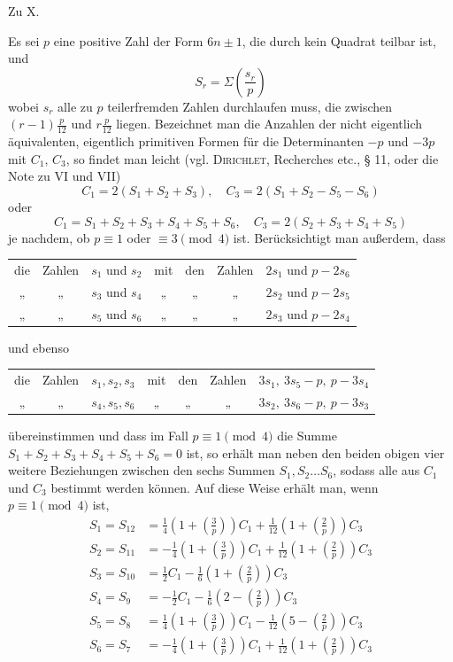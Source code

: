 \begin{center}\large Zu X.\end{center}

Es sei $p$ eine positive Zahl der Form $6n\pm1$, die durch kein Quadrat teilbar ist, und
\[
S_r=\Sigma\left(\frac{s_r}p\right)
\]
wobei $s_r$ alle zu $p$ teilerfremden Zahlen durchlaufen muss, die zwischen $(r-1)\frac p{12}$ und $r\frac p{12}$ liegen. Bezeichnet man die Anzahlen der nicht eigentlich äquivalenten, eigentlich primitiven Formen für die Determinanten $-p$ und $-3p$ mit $C_1$, $C_3$, so findet man leicht (vgl. \textsc{Dirichlet}, Recherches etc., § 11, oder die Note zu VI und VII)
\[
C_1=2(S_1+S_2+S_3),\quad C_3=2(S_1+S_2-S_5-S_6)
\]
oder
\[
C_1=S_1+S_2+S_3+S_4+S_5+S_6,\quad C_3=2(S_2+S_3+S_4+S_5)
\]
je nachdem, ob $p\equiv1$ oder $\equiv3\pmod4$ ist. Berücksichtigt man außerdem, dass
\begin{center}\small
\begin{tabular}{@{}ccccccl@{}}
die&Zahlen&$s_1$ und $s_2$&mit&den&Zahlen&$2s_1$ und $p-2s_6$\\
„&„&$s_3$ und $s_4$&„&„&„&$2s_2$ und $p-2s_5$\\
„&„&$s_5$ und $s_6$&„&„&„&$2s_3$ und $p-2s_4$
\end{tabular}
\end{center}
und ebenso
\begin{center}\small
\begin{tabular}{@{}ccccccl@{}}
die&Zahlen&$s_1,s_2,s_3$&mit&den&Zahlen&$3s_1,\ 3s_5-p,\ p-3s_4$\\
„&„&$s_4,s_5,s_6$&„&„&„&$3s_2,\ 3s_6-p,\ p-3s_3$
\end{tabular}
\end{center}
übereinstimmen und dass im Fall $p\equiv1\pmod4$ die Summe $S_1+S_2+S_3+S_4+S_5+S_6=0$ ist, so erhält man neben den beiden obigen vier weitere Beziehungen zwischen den sechs Summen $S_1,S_2\ldots S_6$, sodass alle aus $C_1$ und $C_3$ bestimmt werden können. Auf diese Weise erhält man, wenn $p\equiv1\pmod4$ ist,
\[
\begin{aligned}
S_1=S_{12}&=\tfrac14\left(1+\left(\frac3p\right)\right)C_1+\tfrac1{12}\left(1+\left(\frac2p\right)\right)C_3\\
S_2=S_{11}&=-\tfrac14\left(1+\left(\frac3p\right)\right)C_1+\tfrac1{12}\left(1+\left(\frac2p\right)\right)C_3\\
S_3=S_{10}&=\tfrac12C_1-\tfrac16\left(1+\left(\frac2p\right)\right)C_3\\
S_4=S_9&=-\tfrac12C_1-\tfrac16\left(2-\left(\frac2p\right)\right)C_3\\
S_5=S_8&=\tfrac14\left(1+\left(\frac3p\right)\right)C_1-\tfrac1{12}\left(5-\left(\frac2p\right)\right)C_3\\
S_6=S_7&=-\tfrac14\left(1+\left(\frac3p\right)\right)C_1+\tfrac1{12}\left(1+\left(\frac2p\right)\right)C_3
\end{aligned}
\]
